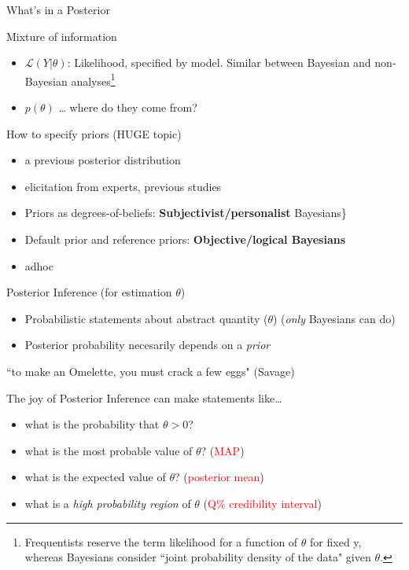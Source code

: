 \documentclass[presentation,9pt,xcolor=dvipsnames]{beamer}
\begin{document}
\begin{frame}[label={sec:org5b06676}]{What's in a Posterior}
\begin{block}{Mixture of information}
\begin{itemize}
\item \(\mathcal{L}(Y\vert\theta)\): Likelihood, specified by model. Similar between Bayesian and non-Bayesian analyses\footnote{Frequentists reserve the term likelihood for a function of $\theta$ for fixed y, whereas Bayesians consider ``joint probability density of the data" given $\theta$.}
\item \(p(\theta)\) \ldots{} where do they come from?
\end{itemize}
\end{block}
\begin{block}{How to specify priors (HUGE topic)}
\begin{itemize}
\item a previous posterior distribution
\item elicitation from experts, previous studies
\item Priors as degrees-of-beliefs: \textbf{Subjectivist/personalist} Bayesians\}
\item Default prior and reference priors: \textbf{Objective/logical Bayesians}
\item adhoc
\end{itemize}
\end{block}
\end{frame}
\begin{frame}[label={sec:orga8393e9}]{Posterior Inference (for estimation \(\theta\))}
\begin{itemize}
\item Probabilistic statements about abstract quantity (\(\theta\)) (\emph{only} Bayesians can do)
\item Posterior probability necesarily depends on a \emph{prior}
\end{itemize}
``to make an Omelette, you must crack a few eggs" (Savage)
\begin{block}{The joy of Posterior Inference}
can make statements like\ldots{}
\begin{itemize}
\item what is the probability that \(\theta>0\)?
\item what is the most probable value of \(\theta\)? (\textcolor{red}{MAP})
\item what is the expected value of \(\theta\)? (\textcolor{red}{posterior mean})
\item what is a \emph{high probability region} of \(\theta\) (\textcolor{red}{Q\% credibility interval})
\end{itemize}
\end{block}
\end{frame}
\end{document}
